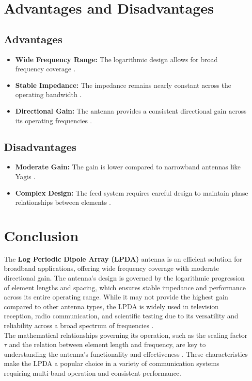 \documentclass[a4paper, 12pt, english]{article}
\begin{document}
\section{Advantages and Disadvantages}
\subsection{Advantages}
\begin{itemize}
    \item \textbf{Wide Frequency Range:} The logarithmic design allows for broad frequency coverage \cite{balanis2016antenna}.
    \item \textbf{Stable Impedance:} The impedance remains nearly constant across the operating bandwidth \cite{nakano1996wideband}.
    \item \textbf{Directional Gain:} The antenna provides a consistent directional gain across its operating frequencies \cite{arrl2014antenna}.
\end{itemize}

\subsection{Disadvantages}
\begin{itemize}
    \item \textbf{Moderate Gain:} The gain is lower compared to narrowband antennas like Yagis \cite{carrel1966design}.
    \item \textbf{Complex Design:} The feed system requires careful design to maintain phase relationships between elements \cite{nakano1996wideband}.
\end{itemize}

\section{Conclusion}
The \textbf{Log Periodic Dipole Array (LPDA)} antenna is an efficient solution for broadband applications, offering wide frequency coverage with moderate directional gain. The antenna’s design is governed by the logarithmic progression of element lengths and spacing, which ensures stable impedance and performance across its entire operating range. While it may not provide the highest gain compared to other antenna types, the LPDA is widely used in television reception, radio communication, and scientific testing due to its versatility and reliability across a broad spectrum of frequencies \cite{balanis2016antenna}\cite{kraus2002antennas}. \\
The mathematical relationships governing its operation, such as the scaling factor $ \tau $ and the relation between element length and frequency, are key to understanding the antenna's functionality and effectiveness \cite{carrel1966design}\cite{arrl2014antenna}. These characteristics make the LPDA a popular choice in a variety of communication systems requiring multi-band operation and consistent performance.

\newpage
\nocite{*}
\printbibliography
\end{document}
